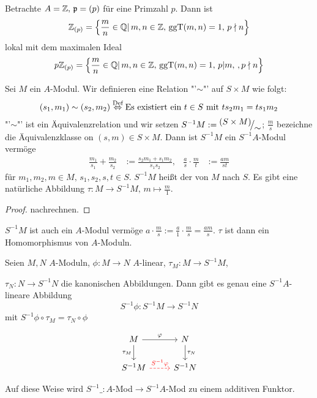 \begin{bsp}
	Betrachte $A=\mathbb{Z}, \, \mathfrak{p} = (p)$ für eine Primzahl $p$. Dann ist $$\mathbb{Z}_{(p)} = \left\{ \frac{m}{n} \in \mathbb{Q}|\, m,n \in \mathbb{Z}, \, \text{ggT}(m,n) = 1, \, p\nmid n\right\}$$
	lokal mit dem maximalen Ideal $$p\mathbb{Z}_{(p)} = \left\{\frac{m}{n} \in \mathbb{Q}| \, m,n\in \mathbb{Z}, \, \text{ggT}(m,n) = 1, \, p |m,\,, p\nmid n\right\}$$
\end{bsp}
\begin{bem+df}\label{12.6}
	Sei $M$ ein $A$-Modul. Wir definieren eine Relation "'$\sim$"' auf $S\times M$ wie folgt:
	$$(s_1,m_1) \sim (s_2, m_2) \overset{\text{Def}}{\Leftrightarrow} \text{Es existiert ein } t\in S \text{ mit } ts_2m_1 = ts_1m_2$$
	"'$\sim$"' ist ein Äquivalenzrelation und wir setzen $S^{-1}M := \QR{(S\times M)}{\sim}$; $\frac{m}{s}$ bezeichne die Äquivalenzklasse on $(s,m) \in S\times M$. Dann ist $S^{-1}M$ ein $S^{-1}A$-Modul vermöge
	\begin{align*}
	\frac{m_1}{s_1}+ \frac{m_2}{s_2}&:= \frac{s_2m_1+s_1m_2}{s_1s_2}, & \frac{a}{s} \cdot \frac{m}{t}&:= \frac{am}{st}
	\end{align*}
	für $m_1,m_2,m \in M, \, s_1,s_2,s,t\in S$. $S^{-1}M$ heißt der  von $M$ nach $S$. Es gibt eine natürliche Abbildung $\tau:M \to S^{-1} M, \, m \mapsto \frac{m}{1}$.
\end{bem+df}
\begin{proof}
	nachrechnen.
\end{proof}
\begin{anm}
	$S^{-1}M$ ist auch ein $A$-Modul vermöge $a\cdot \frac{m}{s} := \frac{a}{1} \cdot \frac{m}{s}= \frac{am}{s}$. $\tau$ ist dann ein Homomorphismus von $A$-Moduln.
\end{anm}
\begin{sa}
	Seien $M,N$ $A$-Moduln, $\phi:M \to N$ $A$-linear, $\tau_M:M \to S^{-1}M$,\\
	\begin{minipage}[t]{0.6\textwidth}
		 $\tau_N:N \to S^{-1}N$ die kanonischen Abbildungen.
		 Dann gibt es genau eine $S^{-1}A$-lineare Abbildung
		$$S^{-1}\phi:S^{-1}M \longrightarrow S^{-1}N $$
		mit $S^{-1}\phi \circ \tau_M = \tau_N \circ \phi$
	\end{minipage}
	\begin{minipage}[t]{0.4\textwidth} 
		$$\begin{tikzcd}
		M \arrow{r}{\phi} \arrow[swap]{d}{\tau_M} & N \arrow{d}{\tau_N} \\
		S^{-1}M \arrow[dashed, red]{r}{S^{-1}\phi}& S^{-1}N
		\end{tikzcd}$$
	\end{minipage}
	Auf diese Weise wird $S^{-1}\_:A$-Mod$\longrightarrow S^{-1}A$-Mod zu einem additiven Funktor.
\end{sa}
